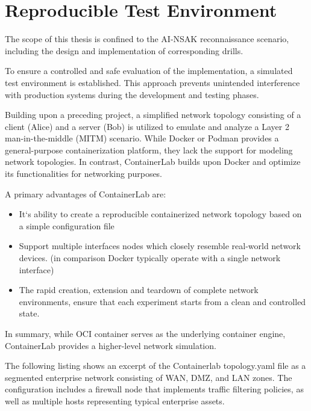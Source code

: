 \newpage
\section{Reproducible Test Environment}\label{sec:reproducible-test-environment}

The scope of this thesis is confined to the AI-NSAK reconnaissance scenario, including the design and implementation of corresponding drills.

To ensure a controlled and safe evaluation of the implementation, a simulated test environment is established. This approach prevents unintended interference with production systems during the development and testing phases.

Building upon a preceding project, a simplified network topology consisting of a client (Alice) and a server (Bob) is utilized to emulate and analyze a Layer 2 man-in-the-middle (MITM) scenario.
While Docker or Podman provides a general-purpose containerization platform, they lack the support for modeling network topologies. In contrast, ContainerLab\cite[]{containerlab} builds upon Docker and optimize its functionalities for networking purposes. 

A primary advantages of ContainerLab are:
\begin{itemize}
	\item It`s ability to create a reproducible containerized network topology based on a simple configuration file
	\item Support multiple interfaces nodes which closely resemble real-world network devices. (in comparison Docker typically operate with a single network interface)
	\item The rapid creation, extension and teardown of complete network environments, ensure that each experiment starts from a clean and controlled state.
\end{itemize}
In summary, while OCI container serves as the underlying container engine, ContainerLab provides a higher-level network simulation.

The following listing shows an excerpt of the Containerlab topology.yaml file as a segmented enterprise network consisting of WAN, DMZ, and LAN zones. The configuration includes a firewall node that implements traffic filtering policies, as well as multiple hosts representing typical enterprise assets.

